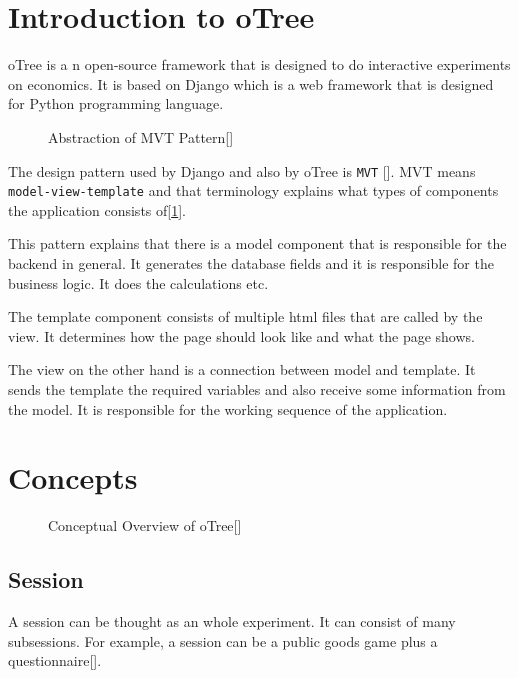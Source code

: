 \section{Introduction to oTree}

oTree is a n open-source framework that is designed to do interactive experiments on economics. It is based on Django which is a web framework that is designed for Python programming language.

\begin{figure}[h]
	\centerline{}
	\caption{Abstraction of MVT Pattern[\cite{DjangoOverview2017}]}
	\label{fig:picture2}
	
\end{figure}

The design pattern used by Django and also by oTree is \verb|MVT| [\cite{DjangoOverview2017}]. MVT means \verb|model-view-template| and that terminology explains what types of components the application consists of[\ref{fig:picture2}].  

This pattern explains that there is a model component that is responsible for the backend in general. It generates the database fields and it is responsible for the business logic. It does the calculations etc.

The template component consists of multiple html files that are called by the view. It determines how the page should look like and what the page shows.

The view on the other hand is a connection between model and template. It sends the template the required variables and also receive some information from the model. It is responsible for the working sequence of the application.

\section{Concepts}

\begin{figure}[h]
	\centerline{}
	\caption{Conceptual Overview of oTree[\cite{oTreeConcepts2017}]}
	\label{fig:picture3}
	
\end{figure}

\subsection{Session}

A session can be thought as an whole experiment. It can consist of many subsessions. For example, a session can be a public goods game plus a questionnaire[\cite{oTreeConcepts2017}].

